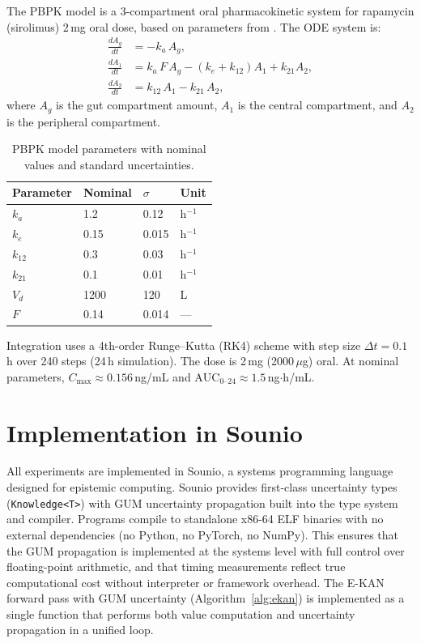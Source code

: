 \documentclass{article}
\begin{document}
The PBPK model is a 3-compartment oral pharmacokinetic system for rapamycin
(sirolimus) 2\,mg oral dose, based on parameters from
\citet{saunders2001rapamycin}.  The ODE system is:
\begin{align}
  \frac{dA_g}{dt} &= -k_a \, A_g, \\
  \frac{dA_1}{dt} &= k_a \, F \, A_g - (k_e + k_{12}) A_1 + k_{21} A_2, \\
  \frac{dA_2}{dt} &= k_{12} \, A_1 - k_{21} \, A_2,
\end{align}
where $A_g$ is the gut compartment amount, $A_1$ is the central compartment,
and $A_2$ is the peripheral compartment.

\begin{table}[h]
\centering
\caption{PBPK model parameters with nominal values and standard
uncertainties.}
\label{tab:pbpk-params}
\begin{tabular}{@{}llll@{}}
\toprule
\textbf{Parameter} & \textbf{Nominal} & \textbf{$\sigma$} & \textbf{Unit} \\
\midrule
$k_a$   & 1.2  & 0.12  & h$^{-1}$ \\
$k_e$   & 0.15 & 0.015 & h$^{-1}$ \\
$k_{12}$ & 0.3 & 0.03  & h$^{-1}$ \\
$k_{21}$ & 0.1 & 0.01  & h$^{-1}$ \\
$V_d$   & 1200 & 120   & L \\
$F$     & 0.14 & 0.014 & --- \\
\bottomrule
\end{tabular}
\end{table}

Integration uses a 4th-order Runge--Kutta (RK4) scheme with step size
$\Delta t = 0.1$\,h over 240 steps (24\,h simulation).  The dose is
2\,mg (2000\,$\mu$g) oral.  At nominal parameters, $C_\mathrm{max}
\approx 0.156$\,ng/mL and $\mathrm{AUC}_{0\text{--}24} \approx
1.5$\,ng$\cdot$h/mL.

\section{Implementation in Sounio}
\label{app:sounio}

All experiments are implemented in Sounio, a systems programming language
designed for epistemic computing.  Sounio provides first-class uncertainty
types (\texttt{Knowledge<T>}) with GUM uncertainty propagation built into the
type system and compiler.  Programs compile to standalone x86-64 ELF binaries
with no external dependencies (no Python, no PyTorch, no NumPy).  This
ensures that the GUM propagation is implemented at the systems level with
full control over floating-point arithmetic, and that timing measurements
reflect true computational cost without interpreter or framework overhead.
The E-KAN forward pass with GUM uncertainty (Algorithm~\ref{alg:ekan}) is
implemented as a single function that performs both value computation and
uncertainty propagation in a unified loop.
\end{document}
